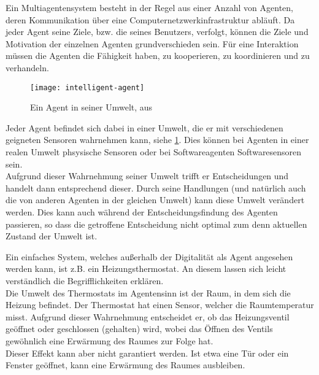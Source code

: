 Ein Multiagentensystem besteht in der Regel aus einer Anzahl von Agenten, deren Kommunikation über eine Computernetzwerkinfrastruktur abläuft.
Da jeder Agent seine Ziele, bzw. die seines Benutzers, verfolgt, können die Ziele und Motivation der einzelnen Agenten grundverschieden sein.
Für eine Interaktion müssen die Agenten die Fähigkeit haben, zu kooperieren, zu koordinieren und zu verhandeln.

\begin{figure}[hptb]
 \centering
 \texttt{[image: intelligent-agent]}
 \caption[Ein Agent in seiner Umwelt]
 		{Ein Agent in seiner Umwelt, aus \cite{multiagent}}
 \label{figure:intelligent-agent}
\end{figure}
\noindent
Jeder Agent befindet sich dabei in einer Umwelt, die er mit verschiedenen geigneten Sensoren wahrnehmen kann, siehe \cref{figure:intelligent-agent}.
Dies können bei Agenten in einer realen Umwelt phsysische Sensoren oder bei Softwareagenten Softwaresensoren sein.
\\
Aufgrund dieser Wahrnehmung seiner Umwelt trifft er Entscheidungen und handelt dann entsprechend dieser.
Durch seine Handlungen (und natürlich auch die von anderen Agenten in der gleichen Umwelt) kann diese Umwelt verändert werden.
Dies kann auch während der Entscheidungsfindung des Agenten passieren, so dass die getroffene Entscheidung nicht optimal zum denn aktuellen Zustand der Umwelt ist.

Ein einfaches System, welches außerhalb der Digitalität als Agent angesehen werden kann, ist z.B. ein Heizungsthermostat.
An diesem lassen sich leicht verständlich die Begrifflichkeiten erklären.
\\
Die Umwelt des Thermostats im Agentensinn ist der Raum, in dem sich die Heizung befindet.
Der Thermostat hat einen Sensor, welcher die Raumtemperatur misst.
Aufgrund dieser Wahrnehmung entscheidet er, ob das Heizungsventil geöffnet oder geschlossen (gehalten) wird, wobei das Öffnen des Ventils gewöhnlich eine Erwärmung des Raumes zur Folge hat.
\\
Dieser Effekt kann aber nicht garantiert werden.
Ist etwa eine Tür oder ein Fenster geöffnet, kann eine Erwärmung des Raumes ausbleiben.



